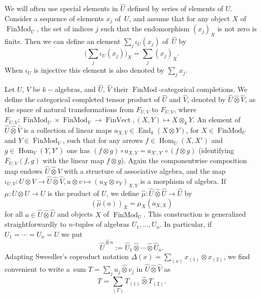 \documentclass[pdftex]{sigma}%
\numberwithin{equation}{section}
\numberwithin{figure}{section}
\begin{document}
We will often use special elements in $\hat{U}$ defined by series of elements of $U$. Consider a sequence of elements $x_j$ of~$U$, and assume that for any object $X$ of $\operatorname{FinMod}_{U}$, the set of indices $j$ such that the endomorphism $(x_j)_X$ is not zero is finite. Then we can define an element $\sum_{j} \iota_U(x_j)$ of~$\hat{U}$ by
\begin{equation}\label{finsum}
\bigg(\sum_{j} \iota_U(x_j)\bigg)_X=\sum_{j} (x_j)_X.
\end{equation}
When $\iota_U$ is injective this element is also denoted by $\sum_{j} x_j$.

Let $U$, $V$ be $k-$algebras, and $\hat{U}$, $\hat{V}$ their $\operatorname{FinMod}$-categorical completions. We define the categorical completed tensor product of $\hat{U}$ and $\hat{ V}$, denoted by $\hat{U}\hat{\otimes} \hat{V}$, as the space of natural transformations from $F_{U,V}$ to $F_{U,V}$, where $F_{U,V}\colon \operatorname{FinMod}_{U}\times \operatorname{FinMod}_{V}\to \operatorname{FinVect}, (X,Y)\mapsto X\otimes_k Y$. An element of $\hat{U}\hat{\otimes}\hat{V}$ is a collection of linear maps $a_{X,Y}\in \operatorname{End}_k(X\otimes Y)$, for $X\in \operatorname{FinMod}_{U}$ and $ Y\in \operatorname{FinMod}_{V}$, such that for any arrows
$f\in \operatorname{Hom}_U(X,X')$ and $g\in \operatorname{Hom}_V(Y,Y')$ one has $(f\otimes g)\circ a_{X,Y}=a_{X',Y'}\circ (f\otimes g)$ (identifying $F_{U,V}(f,g)$ with the linear map $f\otimes g$). Again the componentwise composition map endows $\hat{U}\hat{\otimes}\hat{ V}$ with a structure of associative algebra, and the map $\iota_{U,V}\colon U\otimes V\to \hat{U}\hat{\otimes}\hat{ V}, u\otimes v\mapsto (u_X\otimes v_Y)_{X,Y}$ is a morphism of algebra. If $\mu\colon U\otimes U\to U$ is the product of $U$, we define $\hat{\mu}\colon \hat{U}\hat{\otimes }\hat{U}\to\hat{U}$ by
\[
(\hat{\mu}(a))_X=\mu_X(a_{X,X})
\]
for all $a\in \hat{U}\hat{\otimes }\hat{U}$ and objects $X$ of $\operatorname{FinMod}_{U}$. This construction is generalized straightforwardly to $n$-tuples of algebras $U_1,\dots, U_n$. In particular, if $U_1=\cdots =U_n=U$ we put
\[
\hat{U}^{\hat{\otimes}n}:=\hat{U}_1\widehat{\otimes}\cdots \widehat{\otimes}\hat{U}_n.
\]
Adapting Sweedler's coproduct notation $\Delta(x)=\sum_{(x)}x_{(1)}\otimes x_{(2)}$, we find convenient to write a~sum $ T=\sum_{j}u_j\hat{\otimes} v_j$ in $\hat{U}\hat{\otimes}\hat{V}$ as \[
T=\sum_{(T)}T_{(1)}\hat \otimes T_{(2)}.
\]
\end{document}
